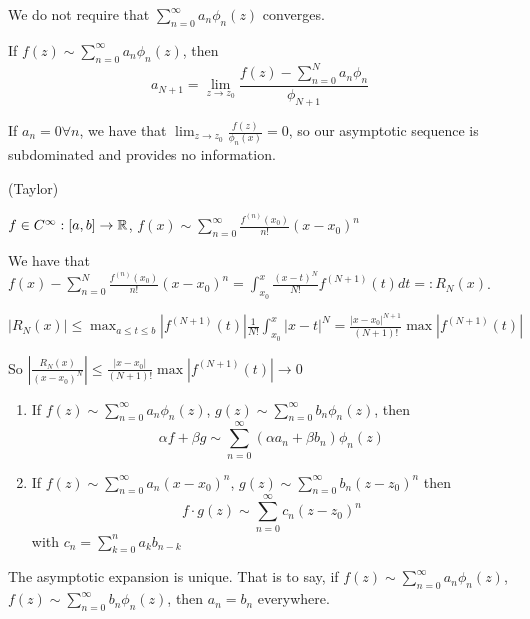 \documentclass[a4paper]{article}
\begin{document}
\begin{remark}
	We do not require that $\sum_{n=0}^{\infty} a_n \phi_n(z)$ converges.
\end{remark}

\begin{prop}
	If $f(z) \sim \sum_{n=0}^{\infty} a_n \phi_n(z)$, then
	\[
		a_{N+1} = \lim_{z\to z_0} \frac{f(z) - \sum_{n=0}^{N} a_n \phi_n}{\phi_{N+1}}
	\] 
\end{prop}

\begin{remark}
	If $a_n =0 \forall n$, we have that $\lim_{z\to z_0} \frac{f(z)}{\phi_n(x)} = 0$, so our asymptotic sequence is subdominated and provides no information.
\end{remark}

\begin{eg} (Taylor)
	
	$f \in C^{\infty}: [a,b] \to \mathbb{R}$, $f(x) \sim \sum_{n=0}^{\infty} \frac{f^{(n)}(x_0)}{n!} (x-x_0)^{n}$

	We have that $f(x) - \sum_{n=0}^{N} \frac{f^{(n)}(x_0)}{n!} (x-x_0)^{n} = \int_{x_0}^{x} \frac{(x-t)^{N}}{N!} f^{(N+1)}(t) dt =: R_N(x)$.

	$|R_N(x)| \le \max_{a\le t\le b} |f^{(N+1)}(t)| \frac{1}{N!}\int_{x_0}^{x} |x-t|^{N} = \frac{|x-x_0|^{N+1}}{(N+1)!} \max |f^{(N+1)}(t)|$

	So $\left|\frac{R_N(x)}{(x-x_0)^{N}} \right| \le \frac{|x-x_0|}{(N+1)!} \max |f^{(N+1)}(t)| \to 0$ 
\end{eg}

\begin{prop}
	\begin{enumerate}
		\item If $f(z) \sim \sum_{n=0}^{\infty} a_n \phi_n(z)$, $g(z) \sim \sum_{n=0}^{\infty} b_n \phi_n(z)$, then
			\[
				\alpha f + \beta g \sim \sum_{n=0}^{\infty} (\alpha a_n+ \beta b_n) \phi_n(z)
			\]

		\item If $f(z) \sim \sum_{n=0}^{\infty} a_n (x-x_0)^{n}$, $g(z) \sim \sum_{n=0}^{\infty} b_n (z-z_0)^{n}$ then
			\[
				f\cdot g (z) \sim \sum_{n=0}^{\infty} c_n (z-z_0)^{n}
		\]
		with $c_n = \sum_{k=0}^{n} a_k b_{n-k}$


	\end{enumerate}
\end{prop}


\begin{prop}
	
	The asymptotic expansion is unique. That is to say, if $f(z) \sim \sum_{n=0}^{\infty} a_n \phi_n(z)$, $f(z) \sim  \sum_{n=0}^{\infty} b_n \phi_n(z)$, then $a_n = b_n$ everywhere.
\end{prop}
\end{document}
